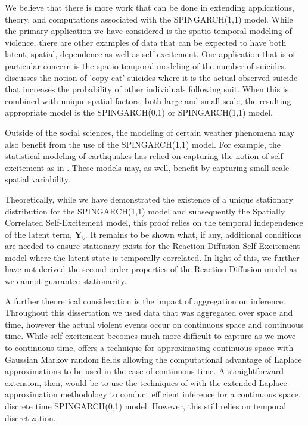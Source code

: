 \documentclass[11pt]{isuthesis}
\begin{document}
	We believe that there is more work that can be done in extending applications, theory, and computations associated with the SPINGARCH(1,1) model.  While the primary application we have considered is the spatio-temporal modeling of violence, there are other examples of data that can be expected to have both latent, spatial, dependence as well as self-excitement.  One application that is of particular concern is the spatio-temporal modeling of the number of suicides.  \cite{phillips1974influence} discusses the notion of 'copy-cat' suicides where it is the actual observed suicide that increases the probability of other individuals following suit.  When this is combined with unique spatial factors, both large and small scale, the resulting appropriate model is the SPINGARCH(0,1) or SPINGARCH(1,1) model.  
	
	Outside of the social sciences, the modeling of certain weather phenomena may also benefit from the use of the SPINGARCH(1,1) model.  For example, the statistical modeling of earthquakes has relied on capturing the notion of self-excitement as in \cite{ogata1988statistical}.  These models may, as well, benefit by capturing small scale spatial variability.
	
	Theoretically, while we have demonstrated the existence of a unique stationary distribution for the SPINGARCH(1,1) model and subsequently the Spatially Correlated Self-Excitement model, this proof relies on the temporal independence of the latent term, $\boldsymbol{Y_t}$.  It remains to be shown what, if any, additional conditions are needed to ensure stationary exists for the Reaction Diffusion Self-Excitement model where the latent state is temporally correlated.  In light of this, we further have not derived the second order properties of the Reaction Diffusion model as we cannot guarantee stationarity.
	
	A further theoretical consideration is the impact of aggregation on inference.  Throughout this dissertation we used data that was aggregated over space and time, however the actual violent events occur on continuous space and continuous time.  While self-excitement becomes much more difficult to capture as we move to continuous time, \cite{lindgren2011explicit} offers a technique for approximating continuous space with Gaussian Markov random fields allowing the computational advantage of Laplace approximations to be used in the case of continuous time.  A straightforward extension, then, would be to use the techniques of \cite{lindgren2011explicit} with the extended Laplace approximation methodology to conduct efficient inference for a continuous space, discrete time SPINGARCH(0,1) model.  However, this still relies on temporal discretization.
	
\end{document}

